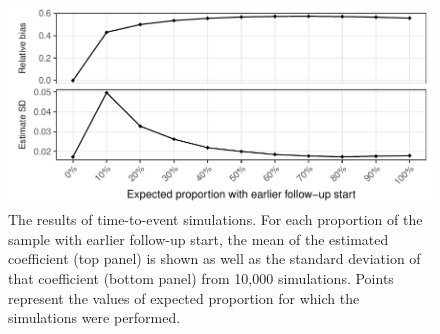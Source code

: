 \begin{figure}[htp]
	\centering
	\includegraphics[width=1\textwidth]{../cox-tarprop-plot/long.pdf}
	\caption{
	The results of time-to-event simulations. For each proportion of the sample with earlier follow-up start, the mean of the estimated coefficient (top panel) is shown as well as the standard deviation of that coefficient (bottom panel) from 10,000 simulations. Points represent the values of expected proportion for which the simulations were performed.
	}
	\label{CoxSimLong}
\end{figure}
